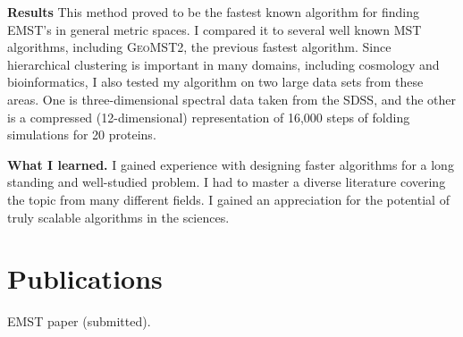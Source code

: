 \documentclass[twoside,leqno, 12pt]{article}
\begin{document}
\begin{figure}[tb]
\begin{center}
\label{runtimes}
\end{center}
\end{figure}

\textbf{Results}
This method proved to be the fastest known algorithm for finding EMST's in general metric spaces.  I compared it to several well known MST algorithms, including \textsc{GeoMST2}, the previous fastest algorithm.  Since hierarchical clustering is important in many domains, including cosmology and bioinformatics, I also tested my algorithm on two large data sets from these areas.  One is three-dimensional spectral data taken from the SDSS, and the other is a compressed (12-dimensional) representation of 16,000 steps of folding simulations for 20 proteins.  

\textbf{What I learned.}  I gained experience with designing faster algorithms for a long standing and well-studied problem.  I had to master a diverse literature covering the topic from many different fields.  I gained an appreciation for the potential of truly scalable algorithms in the sciences.


\section{Publications}

EMST paper (submitted).




\end{document}
